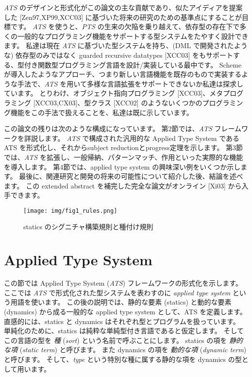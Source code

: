 \documentclass[submit,techreq,noauthor,onecolumn]{ipsj}
\begin{document}
{\it ATS} のデザインと形式化がこの論文の主な貢献であり、似たアイディアを提案した [Zen97,XP99,XCC03] に基づいた将来の研究のための基準点にすることが目標です。
{\it ATS} を使うと、{\it PTS} の生来の欠陥を乗り越えて、依存型の存在下で多くの一般的なプログラミング機能をサポートする型システムをたやすく設計できます。
私達は現在 {\it ATS} に基づいた型システムを持ち、(DML で開発されたような) 依存型のみではなく guarded recursive datatypes [XCC03] をもサポートする、型付き関数型プログラミング言語を設計/実装している最中です。
Scheme が導入したようなアプローチ、つまり新しい言語機能を既存のもので実装するような手法で、{\it ATS} を用いて多様な言語拡張をサポートできないか私達は探求しています。
とりわけ、オブジェクト指向プログラミング [XCC03]、メタプログラミング [XCC03,CX03]、型クラス [XCC02] のようないくつかのプログラミング機能をこの手法で扱えることを、私達は既に示しています。

この論文の残りは次のような構成になっています。
第2節では、{\it ATS} フレームワークを詳説します。
{\it ATS} で構成された汎用的な Applied Type System である ATS を形式化し、それからsubject reductionとprogress定理を示します。
第3節では、{\it ATS} を拡張し、一般帰納、パターンマッチ、作用といった実際的な機能を導入します。
第4節では、applied type system の興味深い例をいくつか示します。
最後に、関連研究と開発の将来の可能性について紹介した後、結論を述べます。
この extended abstract を補完した完全な論文がオンライン [Xi03] から入手できます。

\begin{figure}[h]
\centering
\texttt{[image: img/fig1\_rules.png]}
\caption{statics のシグニチャ構築規則と種付け規則}
\label{fig:fig1_rules}
\end{figure}

\section{Applied Type System}

この節では Applied Type System ({\it ATS}) フレームワークの形式化を示します。
ここでは {\it ATS} で形式化された型システムを表わすのに {\it applied type system} という用語を使います。
この後の説明では、静的な要素 (statics) と動的な要素 (dynamics) から成る一般的な applied type system として、ATS を定義します。
直感的には、statics と dynamics はそれぞれ型とプログラムを扱っています。
単純化のために、statics は純粋な単純型付き言語であると仮定します。
そしてこの言語の型を {\it 種} ({\it sort}) という名前で呼ぶことにします。
statics の項を {\it 静的な項} ({\it static term}) と呼びます。
また dynamics の項を {\it 動的な項} ({\it dynamic term}) と呼びます。
そして、{\it type} という特別な種に属する静的な項を dynamics の型として用います。
\end{document}
